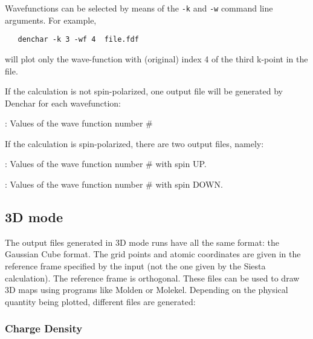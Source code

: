Wavefunctions can be selected by means of the \texttt{-k} and
\texttt{-w} command line arguments. For example,
\begin{verbatim}
   denchar -k 3 -wf 4  file.fdf
\end{verbatim}

will plot only the wave-function with (original) index 4 of the third
k-point in the file.

If the calculation is not spin-polarized,
one output file will be generated by {\sc Denchar}
for each wavefunction:

\begin{description}
\itemsep 10pt
\parsep 0pt

\item[{\bf {\it SystemLabel}.CON.WF\#}]: 
Values of the wave function number \#

\end{description}

If the calculation is spin-polarized, there are 
 two output files, namely:


\begin{description}
\itemsep 10pt
\parsep 0pt

\item[{\bf {\it SystemLabel}.CON.WF\#.UP}]: 
Values of the wave function number \# with spin UP.

\item[{\bf {\it SystemLabel}.CON.WF\#.DOWN}]: 
Values of the wave function number \# with spin DOWN.

\end{description}

\subsection{3D mode}
\label{cap:output3D}

The output files generated in 3D mode runs have all the
same format: the Gaussian Cube format. The grid points and
atomic coordinates are given in the reference frame specified
by the input (not the one given by the  {\sc Siesta}
calculation). The reference frame is orthogonal.
These files can be used to draw 3D maps using programs
like  {\sc Molden} or {\sc Molekel}.
Depending on the physical quantity being plotted, 
different files are generated:

\subsubsection{Charge Density}

